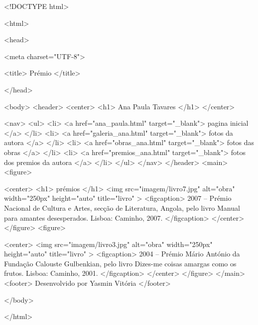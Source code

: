 <!DOCTYPE html>

<html>
       
 <head>
           
    <meta charset="UTF-8">
        
       <title> Prémio </title>
    
    </head>
     
   <body>
   		<header>
      <center>
      <h1>
       Ana Paula Tavares 
       </h1>
      </center>
      
    <nav>
   <ul> 
    <li> <a href="ana_paula.html" target="_blank"> pagina inicial </a> </li>
    <li> <a href="galeria_ana.html" target="_blank"> fotos da autora </a> </li>
    <li> <a href="obras_ana.html" target="_blank"> fotos das obras </a> </li>
    <li> <a href="premios_ana.html" target="_blank"> fotos dos premios da autora </a> </li>
</ul> 
</nav>
</header>
<main>
   <figure>
   
<center> 
   <h1> prémios </h1>
  <img src="imagem/livro7.jpg" alt="obra" width="250px" height="auto" title="livro" >
     <figcaption> 2007 – Prémio Nacional de Cultura e Artes, secção de Literatura, Angola, pelo livro Manual para amantes desesperados. Lisboa: Caminho, 2007.  </figcaption>  
</center>
</figure>
    <figure>
	
 <center>
 <img src="imagem/livro3.jpg" alt="obra" width="250px" height="auto" title="livro" >
<figcaption> 2004 – Prémio Mário António da Fundação Calouste Gulbenkian, pelo livro Dizes-me coisas amargas como os frutos. Lisboa: Caminho, 2001. </figcaption>  
</center>
</figure>
  </main>
 <footer> Desenvolvido por Yasmin Vitória </footer>
 
	 
 </body>
	 
 </html>
